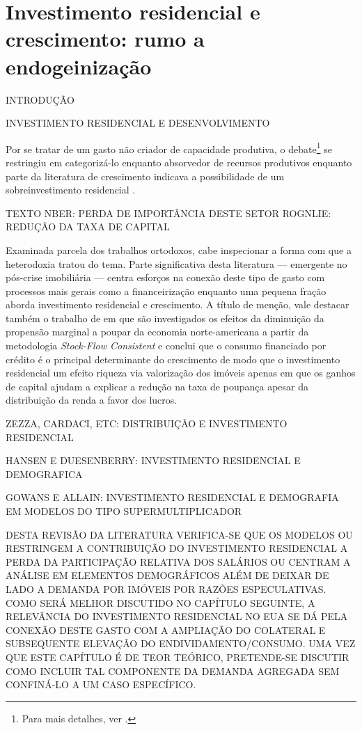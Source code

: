 \section{Investimento residencial e crescimento: rumo a endogeinização}


INTRODUÇÃO

INVESTIMENTO RESIDENCIAL E DESENVOLVIMENTO

Por se tratar de um gasto não criador de capacidade produtiva, o debate\footnote{Para mais detalhes, ver \textcite{arku_housing_2006}.} se restringiu em categorizá-lo enquanto absorvedor de recursos produtivos \cite{solow_importance_1995} enquanto parte da literatura de crescimento indicava  a possibilidade de um sobreinvestimento residencial \cite{mills_has_1987}.

TEXTO NBER: PERDA DE IMPORTÂNCIA DESTE SETOR
ROGNLIE: REDUÇÃO DA TAXA DE CAPITAL

Examinada parcela dos trabalhos ortodoxos, cabe inspecionar a forma com que a heterodoxia tratou do tema. 
Parte significativa desta literatura  --- emergente no pós-crise imobiliária --- centra esforços na conexão deste tipo de gasto com processos mais gerais como a financeirização \cites{aalbers_financialization_2008}{bibow_financialization_2010} enquanto uma pequena fração aborda investimento residencial e crescimento.
A título de menção, vale destacar também o trabalho de \textcite{zezza_u.s._2008} em que são investigados os efeitos da diminuição da propensão marginal a poupar da economia norte-americana a partir da metodologia \textit{Stock-Flow Consistent} e conclui que o consumo financiado por crédito é o principal determinante do crescimento de modo que o investimento residencial um efeito riqueza via valorização dos imóveis apenas em que os ganhos de capital ajudam a explicar a redução na taxa de poupança apesar da distribuição da renda a favor dos lucros. 


ZEZZA, CARDACI, ETC: DISTRIBUIÇÃO E INVESTIMENTO RESIDENCIAL

HANSEN E DUESENBERRY: INVESTIMENTO RESIDENCIAL E DEMOGRAFICA

GOWANS E ALLAIN: INVESTIMENTO RESIDENCIAL E DEMOGRAFIA EM MODELOS DO TIPO SUPERMULTIPLICADOR

DESTA REVISÃO DA LITERATURA VERIFICA-SE QUE OS MODELOS OU RESTRINGEM A CONTRIBUIÇÃO DO INVESTIMENTO RESIDENCIAL A PERDA DA PARTICIPAÇÃO RELATIVA DOS SALÁRIOS OU CENTRAM A ANÁLISE EM ELEMENTOS DEMOGRÁFICOS ALÉM DE DEIXAR DE LADO A DEMANDA POR IMÓVEIS POR RAZÕES ESPECULATIVAS. COMO SERÁ MELHOR DISCUTIDO NO CAPÍTULO SEGUINTE, A RELEVÂNCIA DO INVESTIMENTO RESIDENCIAL NO EUA SE DÁ PELA CONEXÃO DESTE GASTO COM A AMPLIAÇÃO DO COLATERAL E SUBSEQUENTE ELEVAÇÃO DO ENDIVIDAMENTO/CONSUMO. UMA VEZ QUE ESTE CAPÍTULO É DE TEOR TEÓRICO, PRETENDE-SE DISCUTIR COMO INCLUIR TAL COMPONENTE DA DEMANDA AGREGADA SEM CONFINÁ-LO A UM CASO ESPECÍFICO.


